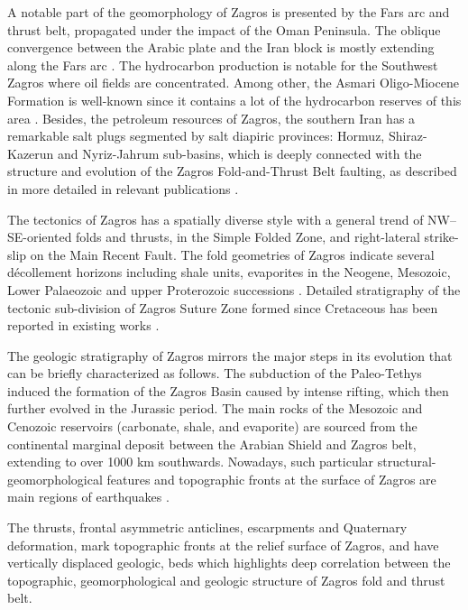 \documentclass[12pt,a4paper,oneside]{article}
\def \newpar{\vspace{6pt}}
\begin{document}
\newpar A notable part of the geomorphology of Zagros is presented by the Fars arc and thrust belt, propagated under the impact of the Oman Peninsula. The oblique convergence between the Arabic plate and the Iran block is mostly extending along the Fars arc \cite{Aubourg}. The hydrocarbon production is notable for the Southwest Zagros where oil fields are concentrated. Among other, the Asmari Oligo-Miocene Formation is well-known since it contains a lot of the hydrocarbon reserves of this area \cite{Ahmadhadi}. Besides, the petroleum resources of Zagros, the southern Iran has a remarkable salt plugs segmented by salt diapiric provinces: Hormuz, Shiraz-Kazerun and Nyriz-Jahrum sub-basins, which is deeply connected with the structure and evolution of the Zagros Fold-and-Thrust Belt faulting, as described in more detailed in relevant publications \cite{Bahroudi,Khodabakhshnezhad,Jahanietal2009}. 

\newpar The tectonics of Zagros has a spatially diverse style with a general trend of NW–SE-oriented folds and thrusts, in the Simple Folded Zone, and right-lateral strike-slip on the Main Recent Fault. The fold geometries of Zagros indicate several décollement horizons including shale units, evaporites in the Neogene, Mesozoic, Lower Palaeozoic and upper Proterozoic successions \cite{Blanc}. Detailed stratigraphy of the tectonic sub-division of Zagros Suture Zone formed since Cretaceous has been reported in existing works \cite{Ali2014,Authemayou,Ali2012}. 

\newpar The geologic stratigraphy of Zagros mirrors the major steps in its evolution that can be briefly characterized as follows. The subduction of the Paleo-Tethys induced the formation of the Zagros Basin caused by intense rifting, which then further evolved in the Jurassic period. The main rocks of the Mesozoic and Cenozoic reservoirs (carbonate, shale, and evaporite) are sourced from the continental marginal deposit between the Arabian Shield and Zagros belt, extending to over 1000 km southwards. Nowadays, such particular structural-geomorphological features and topographic fronts at the surface of Zagros are main regions of earthquakes \cite{Berberian}. 

\newpar The thrusts, frontal asymmetric anticlines, escarpments and Quaternary deformation, mark topographic fronts at the relief surface of Zagros, and have vertically displaced geologic, beds which highlights deep correlation between the topographic, geomorphological and geologic structure of Zagros fold and thrust belt.
\end{document}

